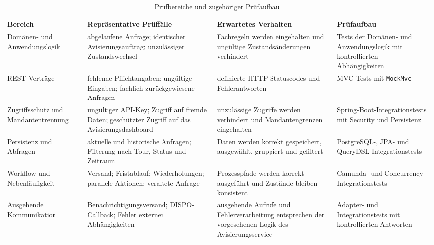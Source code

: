 \begin{table}[htbp]
  \centering
  \footnotesize
  \setlength{\tabcolsep}{3pt}
  \renewcommand{\arraystretch}{1.15}
  \caption{Prüfbereiche und zugehöriger Prüfaufbau}
  \label{tab:backend-pruefbereiche}
  \begin{tabularx}{\textwidth}{@{}
    >{\raggedright\arraybackslash}p{}
    >{\raggedright\arraybackslash}p{}
    >{\raggedright\arraybackslash}p{}
    >{\raggedright\arraybackslash}X@{}}
    \toprule
    \textbf{Bereich}
      & \textbf{Repräsentative Prüffälle}
      & \textbf{Erwartetes Verhalten}
      & \textbf{Prüfaufbau} \\
    \midrule
    Domänen- und Anwendungslogik
      & abgelaufene Anfrage; identischer Avisierungsauftrag; unzulässiger
        Zustandswechsel
      & Fachregeln werden eingehalten und ungültige Zustandsänderungen verhindert
      & Tests der Domänen- und Anwendungslogik mit kontrollierten Abhängigkeiten \\
    REST-Verträge
      & fehlende Pflichtangaben; ungültige Eingaben; fachlich zurückgewiesene Anfragen
      & definierte HTTP-Statuscodes und Fehlerantworten
      & MVC-Tests mit \texttt{MockMvc} \\
    Zugriffsschutz und Mandantentrennung
      & ungültiger API-Key; Zugriff auf fremde Daten; geschützter Zugriff auf das
        Avisierungsdashboard
      & unzulässige Zugriffe werden verhindert und Mandantengrenzen eingehalten
      & Spring-Boot-Integrationstests mit Security und Persistenz \\
    Persistenz und Abfragen
      & aktuelle und historische Anfragen; Filterung nach Tour, Status und Zeitraum
      & Daten werden korrekt gespeichert, ausgewählt, gruppiert und gefiltert
      & PostgreSQL-, JPA- und QueryDSL-Integrationstests \\
    Workflow und Nebenläufigkeit
      & Versand; Fristablauf; Wiederholungen; parallele Aktionen; veraltete Anfrage
      & Prozesspfade werden korrekt ausgeführt und Zustände bleiben konsistent
      & Camunda- und Concurrency-Integrationstests \\
    Ausgehende Kommunikation
      & Benachrichtigungsversand; DISPO-Callback; Fehler externer Abhängigkeiten
      & ausgehende Aufrufe und Fehlerverarbeitung entsprechen der vorgesehenen
        Logik des Avisierungsservice
      & Adapter- und Integrationstests mit kontrollierten Antworten \\
    \bottomrule
  \end{tabularx}
\end{table}

